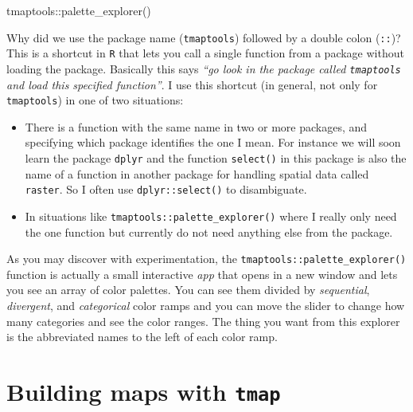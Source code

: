 \documentclass[
]{book}
\newenvironment{Shaded}{\begin{snugshade}}{\end{snugshade}}
\newcommand{\FunctionTok}[1]{\textcolor[rgb]{0.00,0.00,0.00}{#1}}
\newcommand{\NormalTok}[1]{#1}
\newcommand{\SpecialCharTok}[1]{\textcolor[rgb]{0.00,0.00,0.00}{#1}}
\providecommand{\tightlist}{%
  \setlength{\itemsep}{0pt}\setlength{\parskip}{0pt}}
\newenvironment{rmdnote}[1]
  {
  \begin{itemize}
  \renewcommand{\labelitemi}{
    \raisebox{-.7\height}[0pt][0pt]{
      {\setkeys{Gin}{width=3em,keepaspectratio}\texttt{[image: images/\#1]}}
    }
  }
  \setlength{\fboxsep}{1em}
  \begin{note}
  \item
  }
  {
  \end{note}
  \end{itemize}
  }
\begin{document}
\begin{Shaded}
\begin{Highlighting}[]
\NormalTok{tmaptools}\SpecialCharTok{::}\FunctionTok{palette\_explorer}\NormalTok{()}
\end{Highlighting}
\end{Shaded}

\begin{rmdnote}{note}

Why did we use the package name (\texttt{tmaptools}) followed by a double colon (\texttt{::})? This is a shortcut in \texttt{R} that lets you call a single function from a package without loading the package. Basically this says \emph{``go look in the package called \texttt{tmaptools} and load this specified function''}. I use this shortcut (in general, not only for \texttt{tmaptools}) in one of two situations:

\begin{itemize}
\tightlist
\item
  There is a function with the same name in two or more packages, and specifying which package identifies the one I mean. For instance we will soon learn the package \texttt{dplyr} and the function \texttt{select()} in this package is also the name of a function in another package for handling spatial data called \texttt{raster}. So I often use \texttt{dplyr::select()} to disambiguate.
\item
  In situations like \texttt{tmaptools::palette\_explorer()} where I really only need the one function but currently do not need anything else from the package.
\end{itemize}

\end{rmdnote}

As you may discover with experimentation, the \texttt{tmaptools::palette\_explorer()} function is actually a small interactive \emph{app} that opens in a new window and lets you see an array of color palettes. You can see them divided by \emph{sequential}, \emph{divergent}, and \emph{categorical} color ramps and you can move the slider to change how many categories and see the color ranges. The thing you want from this explorer is the abbreviated names to the left of each color ramp.

\hypertarget{building-maps-with-tmap}{%
\section{\texorpdfstring{Building maps with \texttt{tmap}}{Building maps with tmap}}\label{building-maps-with-tmap}}
\end{document}

